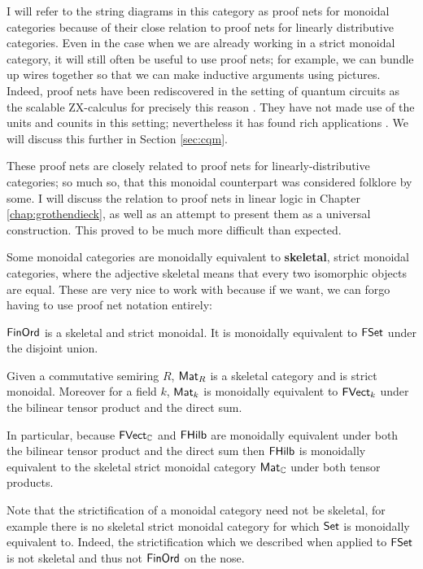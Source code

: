 I will refer to the string diagrams in this category as proof nets for monoidal categories because of their close relation to proof nets for linearly distributive categories.  Even in the case when we are already working in a strict monoidal category, it will still often be useful to use proof nets; for example, we can bundle up wires together so that we can make inductive arguments using pictures.  Indeed, proof nets have been rediscovered in the setting of quantum circuits as the scalable ZX-calculus for precisely this reason \cite{szx}.  They have not made use of the units and counits in this setting; nevertheless it has found rich applications \cite{szxi,szxii}.  We will discuss this further in Section \ref{sec:cqm}.
\begin{aside}
These proof nets are closely related to proof nets for linearly-distributive categories; so much so, that this monoidal counterpart was considered folklore by some.   I will discuss the relation to proof nets in linear logic in Chapter \ref{chap:grothendieck}, as well as an attempt to present them as a universal construction.  This proved to be much more difficult than expected.
\end{aside}
Some monoidal categories are monoidally equivalent to {\bf skeletal}, strict monoidal categories, where the adjective skeletal means that every two isomorphic objects are equal.  These are very nice to work with because if we want, we can forgo having to use proof net notation entirely:
\begin{example}
$\mathsf{FinOrd}$ is a skeletal and strict monoidal. It is monoidally equivalent to $\mathsf{FSet}$ under the disjoint union.


Given a commutative semiring $R$, $\mathsf{Mat}_R$ is a skeletal category and is strict monoidal. Moreover for a field $k$, $\mathsf{Mat}_k$ is monoidally equivalent to $\mathsf{FVect}_k$ under the bilinear tensor product and the direct sum.

In particular, because $\mathsf{FVect}_{\mathbb{C}}$ and $\mathsf{FHilb}$ are monoidally equivalent under both the bilinear tensor product and the direct sum then $\mathsf{FHilb}$ is monoidally equivalent to the skeletal strict monoidal category $\mathsf{Mat}_{\mathbb{C}}$ under both tensor products.
\end{example}
Note that the strictification of a monoidal category need not be skeletal, for example there is no skeletal strict monoidal  category for which $\mathsf{Set}$ is monoidally equivalent to.  Indeed, the strictification which we described when applied to $\mathsf{FSet}$ is not skeletal and thus not $\mathsf{FinOrd}$ on the nose.


